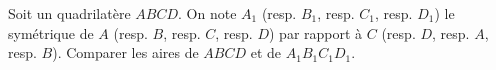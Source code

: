Soit un quadrilatère $ABCD$. On note $A_1$ (resp. $B_1$, resp. $C_1$, resp. $D_1$) le symétrique de $A$ (resp. $B$, resp. $C$, resp. $D$) par rapport à $C$ (resp. $D$, resp. $A$, resp. $B$). Comparer les aires de $ABCD$ et de $A_1B_1C_1D_1$.
